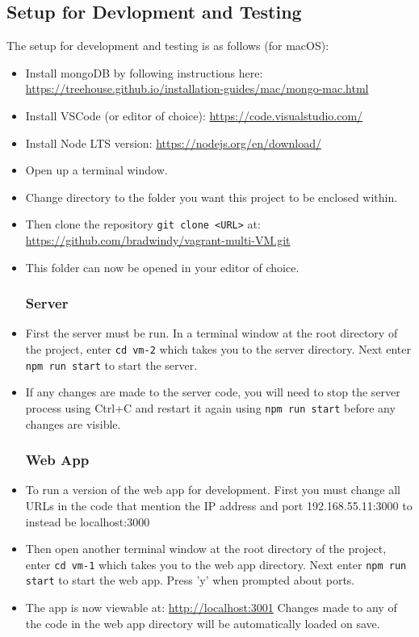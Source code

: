 \documentclass[12pt]{extarticle}
\begin{document}
\subsection{Setup for Devlopment and Testing}
The setup for development and testing is as follows (for macOS):
\begin{itemize}
\subsubsection*{Initial Setup}
\item Install mongoDB by following instructions here: \url{https://treehouse.github.io/installation-guides/mac/mongo-mac.html}
\item Install VSCode (or editor of choice): \url{https://code.visualstudio.com/}
\item Install Node LTS version: \url{https://nodejs.org/en/download/}
\item Open up a terminal window.
\item Change directory to the folder you want this project to be enclosed within.
\item Then clone the repository \lstinline|git clone <URL>| at: \url{https://github.com/bradwindy/vagrant-multi-VM.git}
\item This folder can now be opened in your editor of choice.

\subsubsection*{Server}
\item First the server must be run. In a terminal window at the root directory of the project, enter \lstinline|cd vm-2| which takes you to the server directory. Next enter \lstinline|npm run start| to start the server.
\item If any changes are made to the server code, you will need to stop the server process using Ctrl+C and restart it again using  \lstinline|npm run start| before any changes are visible.

\subsubsection*{Web App}
\item To run a version of the web app for development. First you must change all URLs in the code that mention the IP address and port 192.168.55.11:3000 to instead be localhost:3000
\item Then open another terminal window at the root directory of the project, enter \lstinline|cd vm-1| which takes you to the web app directory. Next enter \lstinline|npm run start| to start the web app. Press 'y' when prompted about ports.
\item The app is now viewable at: \url{http://localhost:3001} Changes made to any of the code in the web app directory will be automatically loaded on save.


\end{itemize}
\end{document}
